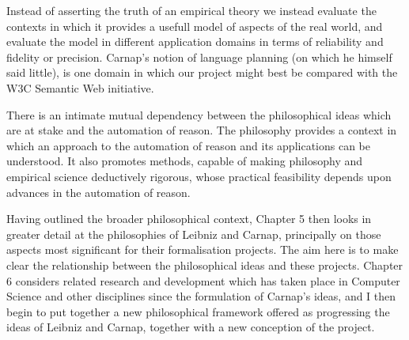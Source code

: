 Instead of asserting the truth of an empirical theory we instead
evaluate the contexts in which it provides a usefull model of aspects
of the real world, and evaluate the model in different application
domains in terms of reliability and fidelity or precision.
Carnap's notion of language planning (on which he himself said
little), is one domain in which our project might best be compared
with the W3C Semantic Web initiative.

There is an intimate mutual dependency between the philosophical ideas
which are at stake and the automation of reason.
The philosophy provides a context in which an approach to the
automation of reason and its applications can be understood.
It also promotes methods, capable of making philosophy and empirical
science deductively rigorous, whose practical feasibility depends upon
advances in the automation of reason.

Having outlined the broader philosophical context, Chapter 5 then
looks in greater detail at the philosophies of Leibniz and Carnap,
principally on those aspects most significant for their formalisation projects.
The aim here is to make clear the relationship between the
philosophical ideas and these projects.
Chapter 6 considers related research and development which has taken
place in Computer Science and other disciplines since the formulation
of Carnap's ideas, and I then begin to put together a new
philosophical framework offered as progressing the ideas of Leibniz
and Carnap, together with a new conception of the project.

